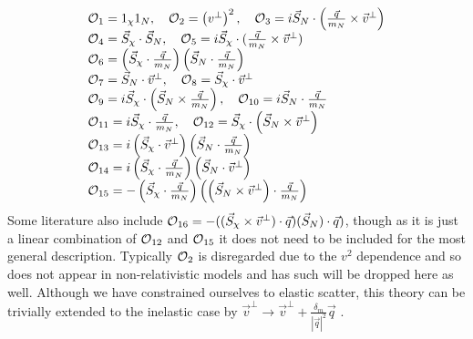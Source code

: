 \begin{equation}
\begin{array}{lcl}
\operatorname{\mathcal{O}}_{1}=1_{\chi}1_N, \quad \operatorname{\mathcal{O}}_{2}=\left(v^{\perp}\right)^{2}, \quad \operatorname{\mathcal{O}}_{3}=i \vec{S}_{N} \cdot\left(\frac{\vec{q}}{m_N} \times \vec{v}^{\perp}\right) \\ 
\operatorname{\mathcal{O}}_{4}=\vec{S}_{\chi} \cdot \vec{S}_{N}, \quad \operatorname{\mathcal{O}}_{5}=i \vec{S}_{\chi} \cdot(\frac{\vec{q}}{m_N} \times \vec{v}^{\perp}) \\ 
\operatorname{\mathcal{O}}_{6}=\left(\vec{S}_{\chi} \cdot \frac{\vec{q}}{m_N}\right)\left(\vec{S}_{N} \cdot \frac{\vec{q}}{m_N}\right) \\
\operatorname{\mathcal{O}}_{7}=\vec{S}_{N} \cdot \vec{v}^{\perp}, \quad \operatorname{\mathcal{O}}_{8}=\vec{S}_{\chi} \cdot \vec{v}^{\perp} \\
\operatorname{\mathcal{O}}_{9}=i \vec{S}_{\chi} \cdot\left(\vec{S}_{N} \times \frac{\vec{q}}{m_N}\right), \quad \operatorname{\mathcal{O}}_{10}=i \vec{S}_{N} \cdot \frac{\vec{q}}{m_N} \\ 
\operatorname{\mathcal{O}}_{11}=i \vec{S}_{\chi} \cdot \frac{\vec{q}}{m_N}, \quad \operatorname{\mathcal{O}}_{12} =\vec{S}_{\chi} \cdot\left(\vec{S}_{N} \times \vec{v}^{\perp}\right) \\
\operatorname{\mathcal{O}}_{13} =i\left(\vec{S}_{\chi} \cdot \vec{v}^{\perp}\right)\left(\vec{S}_{N} \cdot \frac{\vec{q}}{m_N}\right) \\ 
\operatorname{\mathcal{O}}_{14} =i\left(\vec{S}_{\chi} \cdot \frac{\vec{q}}{m_N}\right)\left(\vec{S}_{N} \cdot \vec{v}^{\perp}\right) \\ 
\operatorname{\mathcal{O}}_{15} =-\left(\vec{S}_{\chi} \cdot \frac{\vec{q}}{m_N}\right)\left(\left(\vec{S}_{N} \times \vec{v}^{\perp}\right) \cdot \frac{\vec{q}}{m_N}\right)
\end{array}
\label{eq:EFT_Operators}
\end{equation}
Some literature also include $\operatorname{\mathcal{O}}_{16}=-((\vec{S}_\chi \times \vec{v}^{\bot}) \cdot \vec{q})(\vec{S}_N) \cdot \vec{q})$, though as it is just a linear combination of $\operatorname{\mathcal{O}}_{12}$ and $\operatorname{\mathcal{O}}_{15}$ it does not need to be included for the most general description.
Typically $\operatorname{\mathcal{O}}_{2}$ is disregarded due to the $v^{2}$ dependence and so does not appear in non-relativistic models and has such will be dropped here as well.
Although we have constrained ourselves to elastic scatter, this theory can be trivially extended to the inelastic case by $\vec{v}^{\perp} \rightarrow \vec{v}^{\perp} + \frac{\delta_m}{|\vec{q}|^2}\vec{q}$ \cite{inelastics_eft_ref}.
